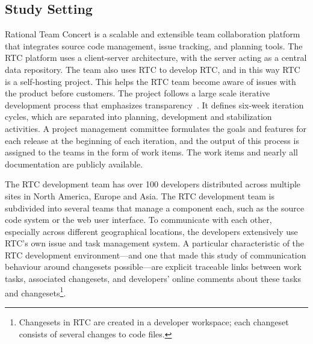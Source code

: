 \subsection{Study Setting}
\label{sec:rtc}
Rational Team Concert is a scalable and extensible team collaboration platform that integrates source code management, issue tracking, and planning tools. The RTC platform uses a client-server architecture, with the server acting as a central data repository.
The team also uses RTC to develop RTC, and in this way RTC is a self-hosting project.
This helps the RTC team become aware of issues with the product before customers.
The project follows a large scale iterative development process that emphasizes transparency~\cite{frost:ieeesoftware:2007}.
It defines six-week iteration cycles, which are  separated into planning, development and stabilization activities. A project management committee formulates the goals and features for each release at the beginning of each iteration, and the output of this process is assigned to the teams in the form of work items. The work items and nearly all documentation are publicly available.

The RTC development team has over 100 developers distributed across multiple sites in North America, Europe and Asia.  The RTC development team is subdivided into several teams that manage a component each, such as the source code system or the web user interface. To communicate with each other, especially across different geographical locations, the developers extensively use RTC's own issue and task management system. A particular characteristic of the RTC development environment---and one that made this study of communication behaviour around changesets possible---are explicit traceable links between work tasks, associated changesets, and developers' online comments about these tasks and changesets\footnote{Changesets in RTC are created in a developer workspace; each changeset consists of several changes to code files.}.
